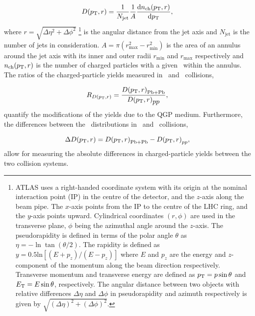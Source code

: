 \begin{align*}
\mbox{$D( \mbox{$p_{\mathrm{T}}$}, r)$} = \frac{1}{N_{\mathrm{jet}}} \frac{1}{A} \frac{\mathrm{d} n_{\mathrm{ch}} (\mbox{$p_{\mathrm{T}}$}, r)}{\mathrm{d} \mbox{$p_{\mathrm{T}}$}},
\end{align*}
where $r = \sqrt{\Delta \eta^2 + \Delta \phi^2}$ \footnote{ATLAS uses a right-handed coordinate system with its origin at the nominal interaction point (IP) in the centre of the detector, and the $z$-axis along the beam pipe.
The $x$-axis points from the IP to the centre of the LHC ring, and the $y$-axis points upward.
Cylindrical coordinates $(r,\phi)$ are used in the transverse plane, $\phi$ being the azimuthal angle around the $z$-axis.
The pseudorapidity is defined in terms of the polar angle $\theta$ as $\eta=-\ln\tan(\theta/2)$.
The rapidity is defined as $y = 0.5\text{ln}[(E + p_z)/(E-p_z)]$ where $E$ and $p_z$ are the energy and $z$-component of the momentum along the beam direction respectively.
Transverse momentum and transverse energy are defined as $\mbox{$p_{\mathrm{T}}$} = p \sin\theta$ and $\mbox{$E_{\mathrm{T}}$} = E \sin\theta$, respectively.
The angular distance between two objects with relative differences $\Delta \eta$ and $\Delta \phi$ in pseudorapidity and azimuth respectively is given by $\sqrt{(\Delta \eta )^2 + (\Delta \phi)^2}$.} 
is the angular distance from the jet axis and $N_{\mathrm{jet}}$ is the number of jets in consideration.
$A = \pi (r_{\mathrm{max}}^2 - r_{\mathrm{min}}^2) $ is the area of an annulus around the jet axis with its inner and outer radii $r_{\mathrm{min}}$ and $r_{\mathrm{max}}$ respectively and $n_{\mathrm{ch}}(\mbox{$p_{\mathrm{T}}$}, r)$ is the number of charged particles with a given \pt\ within the annulus.
The ratios of the charged-particle yields measured in \pbpb\ and \pp\ collisions,

\begin{align*}
   \mbox{$R_{D( p_{\mathrm{T}}, r)}$} = \frac{\mbox{$D( \mbox{$p_{\mathrm{T}}$}, r)$}_\mathrm{Pb+Pb}}{\mbox{$D( \mbox{$p_{\mathrm{T}}$}, r)$}_{\mbox{$pp$}}},
\end{align*}
quantify the modifications of the yields due to the QGP medium.
Furthermore, the differences between the \Dptr\ distributions in \pbpb\ and \pp\ collisions, 

\begin{align*}
   \Delta \mbox{$D( \mbox{$p_{\mathrm{T}}$}, r)$} = \mbox{$D( \mbox{$p_{\mathrm{T}}$}, r)$}_\mathrm{Pb+Pb} - \mbox{$D( \mbox{$p_{\mathrm{T}}$}, r)$}_{pp},
\end{align*}
allow for measuring the absolute differences in charged-particle yields between the two collision systems.



